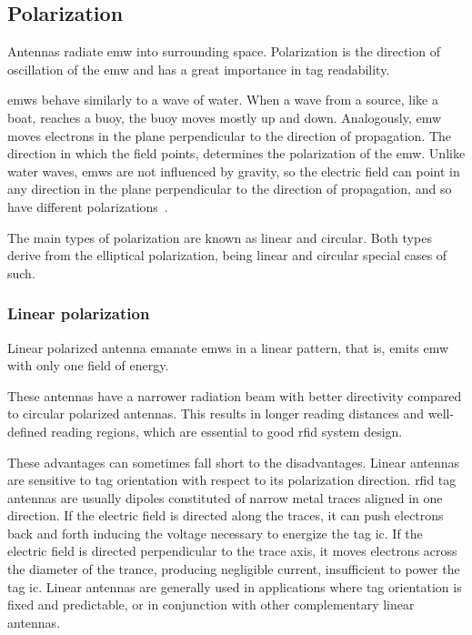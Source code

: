 

\subsection{Polarization}

Antennas radiate \ac{emw} into surrounding space.
Polarization is the direction of oscillation of the \ac{emw} and has a great importance in tag readability.

\acp{emw} behave similarly to a wave of water. When a wave from a source, like a boat, reaches a buoy, the buoy moves mostly up and down.
Analogously, \ac{emw} moves electrons in the plane perpendicular to the direction of propagation. The direction in which the field points, determines the polarization of the \ac{emw}.
Unlike water waves, \acp{emw} are not influenced by gravity, so the electric field can point in any direction in the plane perpendicular to the direction of propagation, and so have different polarizations~\cite{dobkinRFRFIDSecond2012}.

The main types of polarization are known as linear and circular. Both types derive from the elliptical polarization, being linear and circular special cases of such.

\subsubsection{Linear polarization}

Linear polarized antenna emanate \acp{emw} in a linear pattern, that is, emits \ac{emw} with only one field of energy.

These antennas have a narrower radiation beam with better directivity compared to circular polarized antennas. This results in longer reading distances and well-defined reading regions, which are essential to good \ac{rfid} system design.

These advantages can sometimes fall short to the disadvantages. Linear antennas are sensitive to tag orientation with respect to its polarization direction. 
\ac{rfid} tag antennas are usually dipoles constituted of narrow metal traces aligned in one direction. If the electric field is directed along the traces, it can push electrons back and forth inducing the voltage necessary to energize the tag \ac{ic}. If the electric field is directed perpendicular to the trace axis, it moves electrons across the diameter of the trance, producing negligible current, insufficient to power the tag \ac{ic}.
Linear antennas are generally used in applications where tag orientation is fixed and predictable, or in conjunction with other complementary linear antennas.


